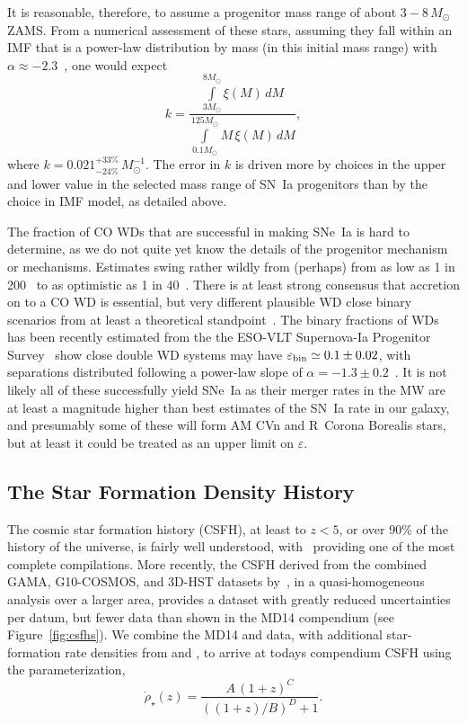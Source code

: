 \documentclass[apj]{aastex62}
\begin{document}
It is reasonable, therefore, to assume a progenitor mass range of about $3-8\,M_{\odot}$ ZAMS. From a numerical assessment of these stars, assuming they fall within an IMF that is a power-law distribution by mass (in this initial mass range) with $\alpha\approx-2.3$~\citep{Salpeter:1955rw,Kroupa:2001gf}, one would expect 
\begin{equation}
k = \frac{\int\limits_{3M_{\odot}}^{8M_{\odot}} \xi(M)\,dM}{\int\limits_{0.1M_{\odot}}^{125M_{\odot}} M\,\xi(M)\,dM},
\end{equation}
\noindent where $k = 0.021^{+33\%}_{-24\%}\,M_{\odot}^{-1}$. The error in $k$ is driven more by choices in the upper and lower value in the selected mass range of SN~Ia progenitors than by the choice in IMF model, as detailed above.

The fraction of CO WDs that are successful in making SNe~Ia is hard to determine, as we do not quite yet know the details of the progenitor mechanism or mechanisms. Estimates swing rather wildly from (perhaps) from as low as 1 in 200~\citep{Breedt:2017rp} to as optimistic as 1 in 40~\citep{Maoz:2012}. There is at least strong consensus that accretion on to a CO WD is essential, but very different plausible WD close binary scenarios from at least a theoretical standpoint~\citep{Nelemans:2001hb,Nelemans:2001cs}. The binary fractions of WDs has been recently estimated from the  the ESO-VLT Supernova-Ia Progenitor Survey~\citep[ SPY]{Napiwotzki:2007} show close double WD systems may have $\varepsilon_{\rm bin}\simeq0.1\pm0.02$, with separations distributed following a power-law slope of $\alpha=-1.3\pm0.2$~\citep{Maoz:2017zl}. It is not likely all of these successfully yield SNe~Ia as their merger rates in the MW are at least a magnitude higher than best estimates of the SN~Ia rate in our galaxy, and presumably some of these will form AM CVn and R~Corona Borealis stars, but at least it could be treated as an upper limit on $\varepsilon$.

\subsection{The Star Formation Density History}
The cosmic star formation history (CSFH), at least to $z < 5$, or over 90\% of the history of the universe, is fairly well understood, with~\cite[][ MD14 hereafter]{Madau:2014fk} providing one of the most complete compilations. More recently, the CSFH derived from the combined GAMA, G10-COSMOS, and 3D-HST datasets by~\cite{Driver:2018nr}, in a quasi-homogeneous analysis over a larger area, provides a dataset with greatly reduced uncertainties per datum, but fewer data than shown in the MD14 compendium (see Figure~\ref{fig:csfhs}).  We combine the MD14 and \cite{Driver:2018nr} data, with additional star-formation rate densities from \cite{Bouwens:2015qy} and \cite{Khusanova:2019kx}, to arrive at todays compendium CSFH using the parameterization,
\begin{equation}
\dot{\rho}_{\star}(z) = \frac{A\,(1+z)^C}{((1+z)/B)^D+1}.\label{eqn:mdp}
\end{equation}
\end{document}
